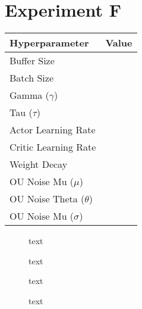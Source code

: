 \section{Experiment F}

\begin{minipage}{0.45\textwidth}
	\centering
	\begin{tabular}{lr}
	\toprule
	\textbf{Hyperparameter} & \textbf{Value} \\
	\midrule
	Buffer Size & \\
	Batch Size & \\
	Gamma ($\gamma$) & \\
	Tau ($\tau$) & \\
	Actor Learning Rate & \\
	Critic Learning Rate & \\
	Weight Decay & \\
	OU Noise Mu ($\mu$) & \\
	OU Noise Theta ($\theta$) & \\
	OU Noise Mu ($\sigma$) & \\
	\bottomrule
	\end{tabular}
\end{minipage}
\hspace{1cm}
\begin{minipage}{0.45\textwidth}
	\centering
\end{minipage}

\begin{figure}[h]
	\begin{minipage}{0.45\textwidth}
		\centering
		
		\caption{text}
		\label{fig:5601_raw_reward}
	\end{minipage}
	\hspace{0.75cm}
	\begin{minipage}{0.45\textwidth}
		\centering
		
		\caption{text}
		\label{fig:5602_average_reward}
	\end{minipage}
\end{figure}

\begin{figure}[h]
	\begin{minipage}{0.45\textwidth}
		\centering
		
		\caption{text}
		\label{fig:5603_frequency_response_1}
	\end{minipage}
	\hspace{0.75cm}
	\begin{minipage}{0.45\textwidth}
		\centering
		
		\caption{text}
		\label{fig:5604_frequency_response_2}
	\end{minipage}
\end{figure}

